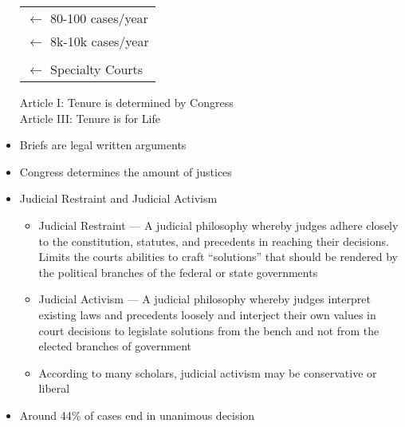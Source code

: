 \documentclass[12pt]{article}
\begin{document}
\begin{itemize}
\begin{tabular}{|c|}
    \end{tabular} \hspace{-9pt} \begin{tabular}{l}

      $\longleftarrow$ 80-100 cases/year\\
      $\longleftarrow$ 8k-10k cases/year\\
      \\
      $\longleftarrow$ Specialty Courts\\

    \end{tabular}

    \begin{center} Article I: Tenure is determined by Congress\\ Article III: Tenure is for Life\end{center}\begin{center}\end{center}

  \item Briefs are legal written arguments

  \item Congress determines the amount of justices

  \item Judicial Restraint and Judicial Activism

    \begin{itemize}

      \item Judicial Restraint — A judicial philosophy whereby judges adhere closely to the constitution, statutes, and precedents in reaching their decisions. Limits the courts abilities to craft “solutions” that should be rendered by the political branches of the federal or state governments

      \item Judicial Activism — A judicial philosophy whereby judges interpret existing laws and precedents loosely and interject their own values in court decisions to legislate solutions from the bench and not from the elected branches of government

      \item According to many scholars, judicial activism may be conservative or liberal

    \end{itemize}

  \item Around 44\% of cases end in unanimous decision


\end{itemize}
\end{document}
